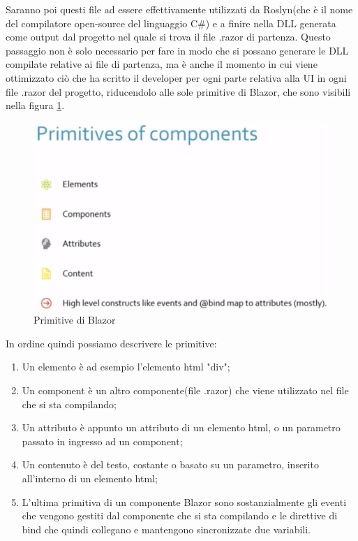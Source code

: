 Saranno poi questi file ad essere effettivamente utilizzati da Roslyn(che \`e il nome del compilatore open-source del linguaggio C\#) e a finire nella DLL generata come output dal progetto nel quale si trova il file .razor di partenza.
Questo passaggio non \`e solo necessario per fare in modo che si possano generare le DLL compilate relative ai file di partenza, ma \`e anche il momento in cui viene ottimizzato ci\`o che ha scritto il developer per ogni parte relativa alla UI in ogni file .razor del progetto, riducendolo alle sole primitive di Blazor, che sono visibili nella figura \ref{fig:BlazorPrimitives}.

\begin{figure}[H]
	\centerline{\includegraphics[scale=0.7]{figure/BlazorPrimitives.PNG}}
	\caption{Primitive di Blazor\cite{ryanNowakNDCSydney}}
	\label{fig:BlazorPrimitives}
\end{figure}

In ordine quindi possiamo descrivere le primitive:
\begin{enumerate}
	\item Un elemento \`e ad esempio l'elemento html "div";
	\item Un component \`e un altro componente(file .razor) che viene utilizzato nel file che si sta compilando;
	\item Un attributo \`e appunto un attributo di un elemento html, o un parametro passato in ingresso ad un component;
	\item Un contenuto \`e del testo, costante o basato su un parametro, inserito all'interno di un elemento html;
	\item L'ultima primitiva di un componente Blazor sono sostanzialmente gli eventi che vengono gestiti dal componente che si sta compilando e le direttive di bind che quindi collegano e mantengono sincronizzate due variabili.
\end{enumerate}

\pagebreak